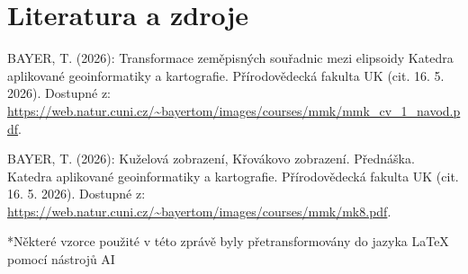 \section{Literatura a zdroje}

BAYER, T. (2026): Transformace zeměpisných souřadnic mezi elipsoidy
Katedra aplikované geoinformatiky a kartografie. Přírodovědecká fakulta UK (cit. 16. 5. 2026). Dostupné z: \url{https://web.natur.cuni.cz/~bayertom/images/courses/mmk/mmk_cv_1_navod.pdf}.

BAYER, T. (2026): Kuželová zobrazení,  Křovákovo zobrazení. Přednáška.
Katedra aplikované geoinformatiky a kartografie. Přírodovědecká fakulta UK (cit. 16. 5. 2026). Dostupné z: \url{https://web.natur.cuni.cz/~bayertom/images/courses/mmk/mk8.pdf}.

*Některé vzorce použité v této zprávě byly přetransformovány do jazyka LaTeX pomocí nástrojů AI